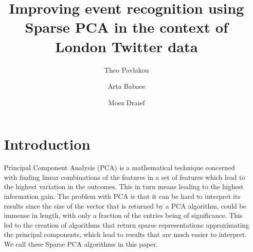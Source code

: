 \documentclass[graybox]{svmult}
\begin{document}
\title*{Improving event recognition using Sparse PCA  in the context of London Twitter data}
\author{Theo Pavlakou \and Arta Babaee \and Moez Draief}
%
%
\maketitle



\section{Introduction}\label{intro}
Principal Component Analysis (PCA) is a mathematical technique concerned with finding linear combinations of the features in a set of features which lead to the highest variation in the outcomes. This in turn means leading to the highest information gain. The problem with PCA is that it can be hard to interpret its results since the size of the vector that is returned by a PCA algorithm, could be immense in length, with only a fraction of the entries being of significance. This led to the creation of algorithms that return sparse representations approximating the principal components, which lead to results that are much easier to interpret. We call these Sparse PCA algorithms in this paper. 
\end{document}
